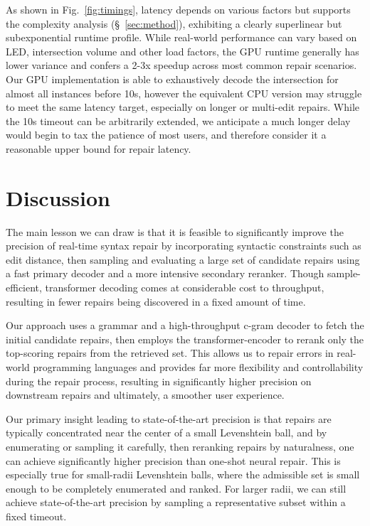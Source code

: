 \documentclass[sigplan,review,acmsmall,nonacm,screen,anonymous]{acmart}\settopmatter{printfolios=false,printccs=false,printacmref=false}
\begin{document}
\noindent As shown in Fig.~\ref{fig:timings}, latency depends on various factors but supports the complexity analysis (\S~\ref{sec:method}), exhibiting a clearly superlinear but subexponential runtime profile. While real-world performance can vary based on LED, intersection volume and other load factors, the GPU runtime generally has lower variance and confers a 2-3x speedup across most common repair scenarios. Our GPU implementation is able to exhaustively decode the intersection for almost all instances before 10s, however the equivalent CPU version may struggle to meet the same latency target, especially on longer or multi-edit repairs. While the 10s timeout can be arbitrarily extended, we anticipate a much longer delay would begin to tax the patience of most users, and therefore consider it a reasonable upper bound for repair latency.

\clearpage\section{Discussion}\label{sec:discussion}

The main lesson we can draw is that it is feasible to significantly improve the precision of real-time syntax repair by incorporating syntactic constraints such as edit distance, then sampling and evaluating a large set of candidate repairs using a fast primary decoder and a more intensive secondary reranker. Though sample-efficient, transformer decoding comes at considerable cost to throughput, resulting in fewer repairs being discovered in a fixed amount of time.

Our approach uses a grammar and a high-throughput c-gram decoder to fetch the initial candidate repairs, then employs the transformer-encoder to rerank only the top-scoring repairs from the retrieved set. This allows us to repair errors in real-world programming languages and provides far more flexibility and controllability during the repair process, resulting in significantly higher precision on downstream repairs and ultimately, a smoother user experience.

Our primary insight leading to state-of-the-art precision is that repairs are typically concentrated near the center of a small Levenshtein ball, and by enumerating or sampling it carefully, then reranking repairs by naturalness, one can achieve significantly higher precision than one-shot neural repair. This is especially true for small-radii Levenshtein balls, where the admissible set is small enough to be completely enumerated and ranked. For larger radii, we can still achieve state-of-the-art precision by sampling a representative subset within a fixed timeout.
\end{document}
